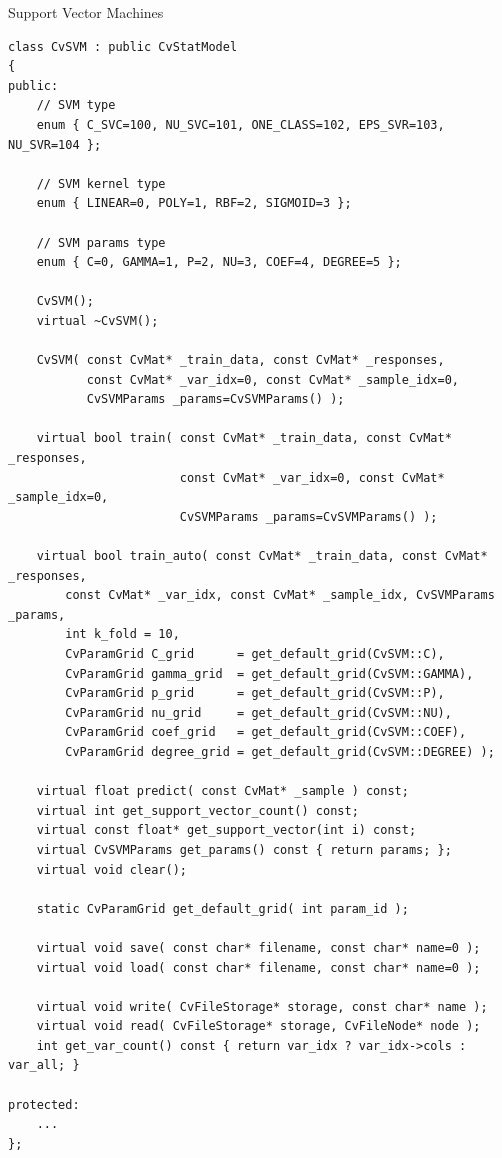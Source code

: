 
Support Vector Machines

\begin{lstlisting}
class CvSVM : public CvStatModel
{
public:
    // SVM type
    enum { C_SVC=100, NU_SVC=101, ONE_CLASS=102, EPS_SVR=103, NU_SVR=104 };

    // SVM kernel type
    enum { LINEAR=0, POLY=1, RBF=2, SIGMOID=3 };

    // SVM params type
    enum { C=0, GAMMA=1, P=2, NU=3, COEF=4, DEGREE=5 };

    CvSVM();
    virtual ~CvSVM();

    CvSVM( const CvMat* _train_data, const CvMat* _responses,
           const CvMat* _var_idx=0, const CvMat* _sample_idx=0,
           CvSVMParams _params=CvSVMParams() );

    virtual bool train( const CvMat* _train_data, const CvMat* _responses,
                        const CvMat* _var_idx=0, const CvMat* _sample_idx=0,
                        CvSVMParams _params=CvSVMParams() );

    virtual bool train_auto( const CvMat* _train_data, const CvMat* _responses,
        const CvMat* _var_idx, const CvMat* _sample_idx, CvSVMParams _params,
        int k_fold = 10,
        CvParamGrid C_grid      = get_default_grid(CvSVM::C),
        CvParamGrid gamma_grid  = get_default_grid(CvSVM::GAMMA),
        CvParamGrid p_grid      = get_default_grid(CvSVM::P),
        CvParamGrid nu_grid     = get_default_grid(CvSVM::NU),
        CvParamGrid coef_grid   = get_default_grid(CvSVM::COEF),
        CvParamGrid degree_grid = get_default_grid(CvSVM::DEGREE) );

    virtual float predict( const CvMat* _sample ) const;
    virtual int get_support_vector_count() const;
    virtual const float* get_support_vector(int i) const;
    virtual CvSVMParams get_params() const { return params; };
    virtual void clear();

    static CvParamGrid get_default_grid( int param_id );

    virtual void save( const char* filename, const char* name=0 );
    virtual void load( const char* filename, const char* name=0 );

    virtual void write( CvFileStorage* storage, const char* name );
    virtual void read( CvFileStorage* storage, CvFileNode* node );
    int get_var_count() const { return var_idx ? var_idx->cols : var_all; }

protected:
    ...
};

\end{lstlisting}


